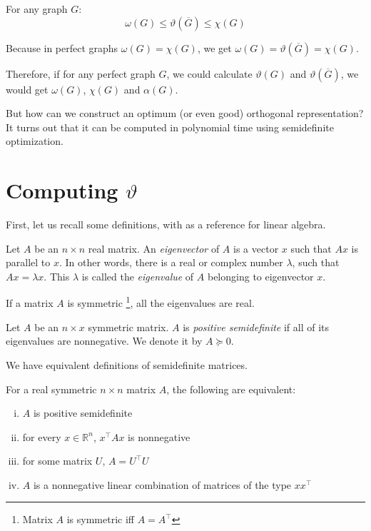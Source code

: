 \begin{theorem}
  \label{thm:sandwich}
  For any graph $G$:
  $$ \omega(G) \leq \vartheta(\overline{G}) \leq \chi(G) $$
\end{theorem}

Because in perfect graphs $\omega(G) = \chi(G)$, we get $\omega(G) = \vartheta(\overline{G}) = \chi(G)$.

Therefore, if for any perfect graph $G$, we could calculate $\vartheta(G)$ and $\vartheta(\overline{G})$, we would get $\omega(G)$, $\chi(G)$ and $\alpha(G)$.

But how can we construct an optimum (or even good) orthogonal representation? It turns out that it can be computed in polynomial time using semidefinite optimization.

\section{Computing \boldmath$\vartheta$}
\label{sec:computingTheta}

First, let us recall some definitions, with \cite{gilbertstrang2020} as a reference for linear algebra. 

\begin{defn}
  Let $A$ be an $n \times n$ real matrix. An \emph{eigenvector} of $A$ is a vector $x$ such that $Ax$ is parallel to $x$. In other words, there is a real or complex number $\lambda$, such that $Ax = \lambda x$. This $\lambda$ is called the \emph{eigenvalue} of $A$ belonging to eigenvector $x$.
\end{defn}

If a matrix $A$ is symmetric \footnote{Matrix $A$ is symmetric iff $A = A^\intercal$}, all the eigenvalues are real.

\begin{defn}
  Let $A$ be an $n \times x$ symmetric matrix. $A$ is \emph{positive semidefinite} if all of its eigenvalues are nonnegative. We denote it by $A \succeq 0$.
\end{defn}

We have equivalent definitions of semidefinite matrices.
\begin{theorem}
  For a real symmetric $n \times n$ matrix $A$, the following are equivalent:
  \begin{enumerate}[(i)]
    \item $A$ is positive semidefinite
    \item \label{en:ei2} for every $x \in \mathbb{R}^n$, $x^\intercal Ax$ is nonnegative
    \item for some matrix $U$, $A = U^\intercal U$
    \item $A$ is a nonnegative linear combination of matrices of the type $xx^\intercal$
  \end{enumerate}
\end{theorem}

